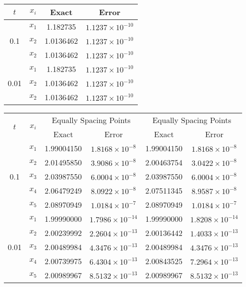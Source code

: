 \documentclass[12pt, a4paper]{article}
\begin{document}
\begin{table}[ht]
		\centering
	\renewcommand{\arraystretch}{1.5}
	\begin{english}
				\begin{tabular}{|c|c|c|c|}
			\hline
			$t$ & $x_i$ & Exact & Error\\
			\hline
			\multirow{3}{*}{0.1} & $x_1$  &1.182735 & $1.1237\times10^{-10}$ \\
			& $x_2$ & 1.0136462 & $1.1237\times10^{-10}$ \\
			& $x_2$ & 1.0136462 & $1.1237\times10^{-10}$ \\
			\hline
			\multirow{3}{*}{0.01} & $x_1$  &1.182735 & $1.1237\times10^{-10}$ \\
			& $x_2$ & 1.0136462 & $1.1237\times10^{-10}$ \\
			& $x_2$ & 1.0136462 & $1.1237\times10^{-10}$ \\
			\hline
		\end{tabular}
	\end{english}
\end{table}

\begin{table}[ht]
	\renewcommand{\arraystretch}{1.5}
	\centering
	\begin{tabular}{|c|c|c|c|c|c|}
		\hline
		\multirow{2}{*}{\( t \)} & \multirow{2}{*}{\( x_i \)} & \multicolumn{2}{c|}{Equally Spacing Points} & \multicolumn{2}{c|}{Equally Spacing Points} \\
		\cline{3-6}
		& & Exact & Error & Exact & Error \\
		\hline
		\multirow{5}{*}{0.1} & \( x_1 \) & 1.99004150 & \( 1.8168 \times 10^{-8} \) & 1.99004150 & \( 1.8168 \times 10^{-8} \) \\
		& \( x_2 \) & 2.01495850 & \( 3.9086 \times 10^{-8} \) & 2.00463754 & \( 3.0422 \times 10^{-8} \) \\
		& \( x_3 \) & 2.03987550 & \( 6.0004 \times 10^{-8} \) & 2.03987550 & \( 6.0004 \times 10^{-8} \) \\
		& \( x_4 \) & 2.06479249 & \( 8.0922 \times 10^{-8} \) & 2.07511345 & \( 8.9587 \times 10^{-8} \) \\
		& \( x_5 \) & 2.08970949 & \( 1.0184 \times 10^{-7} \) & 2.08970949 & \( 1.0184 \times 10^{-7} \) \\
		\hline
		\multirow{5}{*}{0.01} & \( x_1 \) & 1.99990000 & \( 1.7986 \times 10^{-14} \) & 1.99990000 & \( 1.8208 \times 10^{-14} \) \\
		& \( x_2 \) & 2.00239992 & \( 2.2604 \times 10^{-13} \) & 2.00136442 & \( 1.4033 \times 10^{-13} \) \\
		& \( x_3 \) & 2.00489984 & \( 4.3476 \times 10^{-13} \) & 2.00489984 & \( 4.3476 \times 10^{-13} \) \\
		& \( x_4 \) & 2.00739975 & \( 6.4304 \times 10^{-13} \) & 2.00843525 & \( 7.2964 \times 10^{-13} \) \\
		& \( x_5 \) & 2.00989967 & \( 8.5132 \times 10^{-13} \) & 2.00989967 & \( 8.5132 \times 10^{-13} \) \\
		\hline
	\end{tabular}
\end{table}
\end{document}
